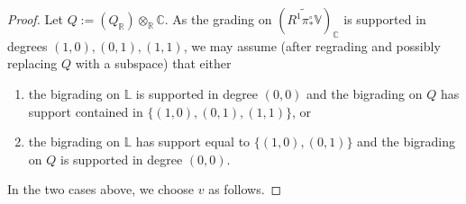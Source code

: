 \begin{proof}

Let $Q := (Q_\mathbb R) \otimes_{\mathbb R} \mathbb C$.
As the grading on $(\widetilde{R^1 \pi^\circ_* \mathbb V})_{\mathbb C}$ is supported in degrees $(1,0), (0,1), (1,1)$, we may assume (after regrading and possibly replacing $Q$ with a subspace) that either
\begin{enumerate}
\item the bigrading on $\mathbb{L}$ is supported in degree $(0,0)$ and the bigrading on $Q$ has support contained in  $\{(1,0), (0,1), (1,1)\}$, or
\item the bigrading on $\mathbb{L}$ has support equal to $\{(1,0),(0,1)\}$
	and the bigrading on $Q$ is supported in degree $(0,0)$.
\end{enumerate}
In the two cases above, we choose $v$ as follows.


\end{proof}
